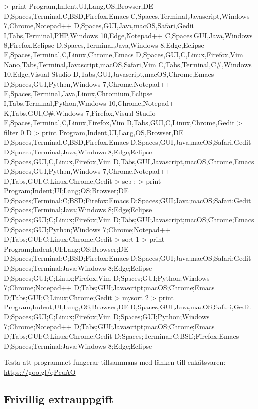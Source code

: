 \begin{REPLnonum}
> print
Program,Indent,UI,Lang,OS,Browser,DE
D,Spaces,Terminal,C,BSD,Firefox,Emacs
C,Spaces,Terminal,Javascript,Windows 7,Chrome,Notepad++
D,Spaces,GUI,Java,macOS,Safari,Gedit
I,Tabs,Terminal,PHP,Windows 10,Edge,Notepad++
C,Spaces,GUI,Java,Windows 8,Firefox,Eclipse
D,Spaces,Terminal,Java,Windows 8,Edge,Eclipse
F,Spaces,Terminal,C,Linux,Chrome,Emacs
D,Spaces,GUI,C,Linux,Firefox,Vim
Nano,Tabs,Terminal,Javascript,macOS,Safari,Vim
C,Tabs,Terminal,C#,Windows 10,Edge,Visual Studio
D,Tabs,GUI,Javascript,macOS,Chrome,Emacs
D,Spaces,GUI,Python,Windows 7,Chrome,Notepad++
E,Spaces,Terminal,Java,Linux,Chromium,Eclipse
I,Tabs,Terminal,Python,Windows 10,Chrome,Notepad++
K,Tabs,GUI,C#,Windows 7,Firefox,Visual Studio
F,Spaces,Terminal,C,Linux,Firefox,Vim
D,Tabs,GUI,C,Linux,Chrome,Gedit
> filter 0 D
> print
Program,Indent,UI,Lang,OS,Browser,DE
D,Spaces,Terminal,C,BSD,Firefox,Emacs
D,Spaces,GUI,Java,macOS,Safari,Gedit
D,Spaces,Terminal,Java,Windows 8,Edge,Eclipse
D,Spaces,GUI,C,Linux,Firefox,Vim
D,Tabs,GUI,Javascript,macOS,Chrome,Emacs
D,Spaces,GUI,Python,Windows 7,Chrome,Notepad++
D,Tabs,GUI,C,Linux,Chrome,Gedit
> sep ;
> print
Program;Indent;UI;Lang;OS;Browser;DE
D;Spaces;Terminal;C;BSD;Firefox;Emacs
D;Spaces;GUI;Java;macOS;Safari;Gedit
D;Spaces;Terminal;Java;Windows 8;Edge;Eclipse
D;Spaces;GUI;C;Linux;Firefox;Vim
D;Tabs;GUI;Javascript;macOS;Chrome;Emacs
D;Spaces;GUI;Python;Windows 7;Chrome;Notepad++
D;Tabs;GUI;C;Linux;Chrome;Gedit
> sort 1
> print
Program;Indent;UI;Lang;OS;Browser;DE
D;Spaces;Terminal;C;BSD;Firefox;Emacs
D;Spaces;GUI;Java;macOS;Safari;Gedit
D;Spaces;Terminal;Java;Windows 8;Edge;Eclipse
D;Spaces;GUI;C;Linux;Firefox;Vim
D;Spaces;GUI;Python;Windows 7;Chrome;Notepad++
D;Tabs;GUI;Javascript;macOS;Chrome;Emacs
D;Tabs;GUI;C;Linux;Chrome;Gedit
> mysort 2
> print
Program;Indent;UI;Lang;OS;Browser;DE
D;Spaces;GUI;Java;macOS;Safari;Gedit
D;Spaces;GUI;C;Linux;Firefox;Vim
D;Spaces;GUI;Python;Windows 7;Chrome;Notepad++
D;Tabs;GUI;Javascript;macOS;Chrome;Emacs
D;Tabs;GUI;C;Linux;Chrome;Gedit
D;Spaces;Terminal;C;BSD;Firefox;Emacs
D;Spaces;Terminal;Java;Windows 8;Edge;Eclipse
\end{REPLnonum}

\Task Testa att programmet fungerar tillsammans med länken till enkätsvaren: \url{https://goo.gl/qPcuAO}

\clearpage

\subsection{Frivillig extrauppgift}

